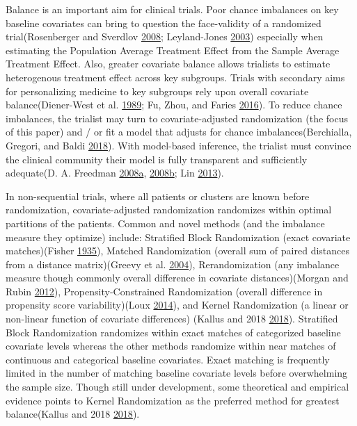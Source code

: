 \documentclass[12pt,oneside]{book}
\newlength{\li}\setlength{\li}{14.48pt}
\newlength{\di}\setlength{\di}{-3.5mm}
\theoremstyle{definition}
\theoremstyle{definition}
\theoremstyle{definition}
\theoremstyle{remark}
\begin{document}
Balance is an important aim for clinical trials. Poor chance imbalances
on key baseline covariates can bring to question the face-validity of a
randomized trial(Rosenberger and Sverdlov
\protect\hyperlink{ref-Rosenberger:2008cm}{2008}; Leyland-Jones
\protect\hyperlink{ref-LeylandJones:2003kt}{2003}) especially when
estimating the Population Average Treatment Effect from the Sample
Average Treatment Effect. Also, greater covariate balance allows
trialists to estimate heterogenous treatment effect across key
subgroups. Trials with secondary aims for personalizing medicine to key
subgroups rely upon overall covariate balance(Diener-West et al.
\protect\hyperlink{ref-DienerWest:1989uq}{1989}; Fu, Zhou, and Faries
\protect\hyperlink{ref-Fu:2016jy}{2016}). To reduce chance imbalances,
the trialist may turn to covariate-adjusted randomization (the focus of
this paper) and / or fit a model that adjusts for chance
imbalances(Berchialla, Gregori, and Baldi
\protect\hyperlink{ref-Berchialla:2018bk}{2018}). With model-based
inference, the trialist must convince the clinical community their model
is fully transparent and sufficiently adequate(D. A. Freedman
\protect\hyperlink{ref-Freedman:2008eq}{2008}\protect\hyperlink{ref-Freedman:2008eq}{a},
\protect\hyperlink{ref-Freedman:2008em}{2008}\protect\hyperlink{ref-Freedman:2008em}{b};
Lin \protect\hyperlink{ref-Lin:2013jh}{2013}).

In non-sequential trials, where all patients or clusters are known
before randomization, covariate-adjusted randomization randomizes within
optimal partitions of the patients. Common and novel methods (and the
imbalance measure they optimize) include: Stratified Block Randomization
(exact covariate matches)(Fisher
\protect\hyperlink{ref-fisher1935design}{1935}), Matched Randomization
(overall sum of paired distances from a distance matrix)(Greevy et al.
\protect\hyperlink{ref-Greevy:2004ke}{2004}), Rerandomization (any
imbalance measure though commonly overall difference in covariate
distances)(Morgan and Rubin
\protect\hyperlink{ref-Morgan:2012iq}{2012}), Propensity-Constrained
Randomization (overall difference in propensity score variability)(Loux
\protect\hyperlink{ref-Loux:2014bu}{2014}), and Kernel Randomization (a
linear or non-linear function of covariate differences) (Kallus and 2018
\protect\hyperlink{ref-Kallus:2018um}{2018}). Stratified Block
Randomization randomizes within exact matches of categorized baseline
covariate levels whereas the other methods randomize within near matches
of continuous and categorical baseline covariates. Exact matching is
frequently limited in the number of matching baseline covariate levels
before overwhelming the sample size. Though still under development,
some theoretical and empirical evidence points to Kernel Randomization
as the preferred method for greatest balance(Kallus and 2018
\protect\hyperlink{ref-Kallus:2018um}{2018}).
\end{document}
